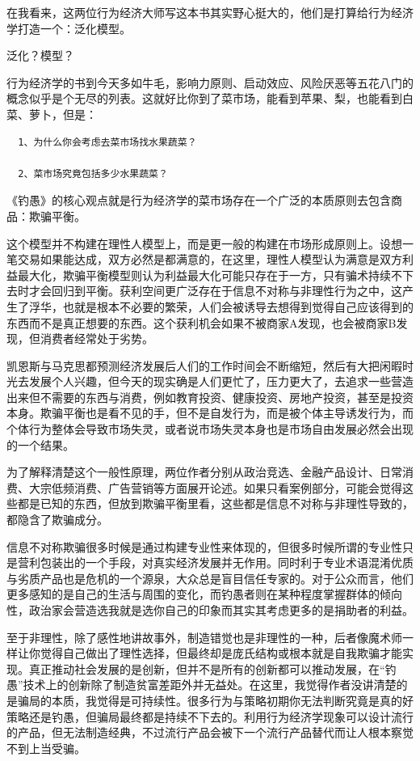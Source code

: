 \documentclass[
]{book}
\begin{document}
在我看来，这两位行为经济大师写这本书其实野心挺大的，他们是打算给行为经济学打造一个：泛化模型。

泛化？模型？

行为经济学的书到今天多如牛毛，影响力原则、启动效应、风险厌恶等五花八门的概念似乎是个无尽的列表。这就好比你到了菜市场，能看到苹果、梨，也能看到白菜、萝卜，但是：

\begin{verbatim}
  1、为什么你会考虑去菜市场找水果蔬菜？

  2、菜市场究竟包括多少水果蔬菜？
\end{verbatim}

《钓愚》的核心观点就是行为经济学的菜市场存在一个广泛的本质原则去包含商品：欺骗平衡。

这个模型并不构建在理性人模型上，而是更一般的构建在市场形成原则上。设想一笔交易如果能达成，双方必然是都满意的，在这里，理性人模型认为满意是双方利益最大化，欺骗平衡模型则认为利益最大化可能只存在于一方，只有骗术持续不下去时才会回归到平衡。获利空间更广泛存在于信息不对称与非理性行为之中，这产生了浮华，也就是根本不必要的繁荣，人们会被诱导去想得到觉得自己应该得到的东西而不是真正想要的东西。这个获利机会如果不被商家A发现，也会被商家B发现，但消费者经常处于劣势。

凯恩斯与马克思都预测经济发展后人们的工作时间会不断缩短，然后有大把闲暇时光去发展个人兴趣，但今天的现实确是人们更忙了，压力更大了，去追求一些营造出来但不需要的东西与消费，例如教育投资、健康投资、房地产投资，甚至是投资本身。欺骗平衡也是看不见的手，但不是自发行为，而是被个体主导诱发行为，而个体行为整体会导致市场失灵，或者说市场失灵本身也是市场自由发展必然会出现的一个结果。

为了解释清楚这个一般性原理，两位作者分别从政治竞选、金融产品设计、日常消费、大宗低频消费、广告营销等方面展开论述。如果只看案例部分，可能会觉得这些都是已知的东西，但放到欺骗平衡里看，这些都是信息不对称与非理性导致的，都隐含了欺骗成分。

信息不对称欺骗很多时候是通过构建专业性来体现的，但很多时候所谓的专业性只是营利包装出的一个手段，对真实经济发展并无作用。同时利于专业术语混淆优质与劣质产品也是危机的一个源泉，大众总是盲目信任专家的。对于公众而言，他们更多感知的是自己的生活与周围的变化，而钓愚者则在某种程度掌握群体的倾向性，政治家会营造选我就是选你自己的印象而其实其考虑更多的是捐助者的利益。

至于非理性，除了感性地讲故事外，制造错觉也是非理性的一种，后者像魔术师一样让你觉得自己做出了理性选择，但最终却是庞氏结构或根本就是自我欺骗才能实现。真正推动社会发展的是创新，但并不是所有的创新都可以推动发展，在``钓愚''技术上的创新除了制造贫富差距外并无益处。在这里，我觉得作者没讲清楚的是骗局的本质，我觉得是可持续性。很多行为与策略初期你无法判断究竟是真的好策略还是钓愚，但骗局最终都是持续不下去的。利用行为经济学现象可以设计流行的产品，但无法制造经典，不过流行产品会被下一个流行产品替代而让人根本察觉不到上当受骗。
\end{document}
